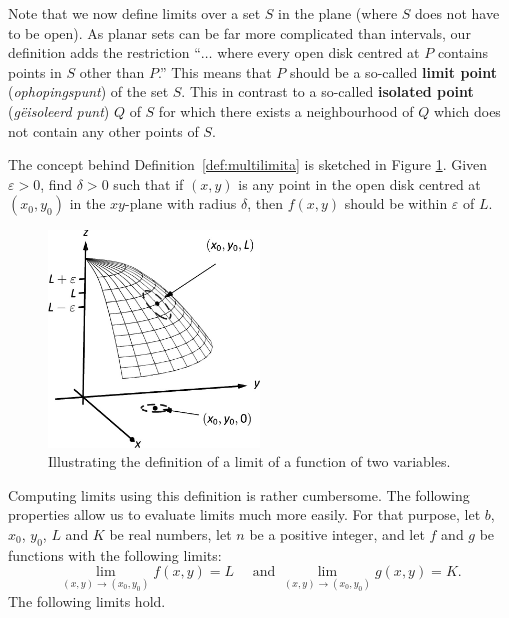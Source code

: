 Note that we now define limits over a set $S$ in the plane (where $S$ does not have to be open). As planar sets can be far more complicated than intervals, our definition adds the restriction ``$\ldots$ where every open disk centred at $P$ contains points in $S$ other than $P$.'' This means that $P$ should be a so-called \textbf{limit point} (\textit{ophopingspunt}) of the set $S$. This in contrast to a so-called \textbf{isolated point} (\textit{g\"eisoleerd punt}) $Q$ of $S$ for which there exists a neighbourhood of $Q$ which does not contain any other points of $S$.


The concept behind Definition~\ref{def:multilimita} is sketched in Figure \ref{fig_multi_var_7}. Given $\varepsilon>0$, find $\delta>0$ such that if $(x,y)$ is any point in the open disk centred at $(x_0,y_0)$ in the $xy$-plane with radius $\delta$, then $f(x,y)$ should be within $\varepsilon$ of $L$. 

\begin{figure}[H]
	\begin{center}
			\includegraphics[width=0.5\textwidth]{fig_multi_var_7}
	\caption{Illustrating the definition of a limit of a function of two variables.}
	\label{fig_multi_var_7}
	\end{center}
\end{figure}

\ifcalculus
Computing limits using this definition is rather cumbersome. The following properties allow us to evaluate limits much more easily. For that purpose, let $b$, $x_0$, $y_0$, $L$ and $K$ be real numbers,  let $n$ be a positive integer, and let $f$ and $g$ be functions with the following limits:
$$\lim_{(x,y)\to (x_0,y_0)}f(x,y) = L \quad \text{\ and\ } \lim_{(x,y)\to (x_0,y_0)} g(x,y) = K.$$
The following limits hold.


